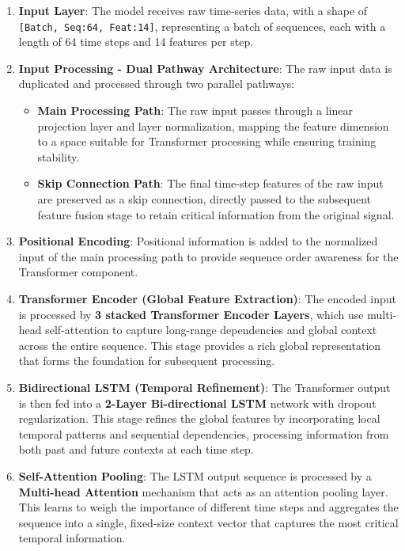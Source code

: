 \begin{enumerate}
    \item \textbf{Input Layer}: The model receives raw time-series data, with a shape of \texttt{[Batch, Seq:64, Feat:14]}, representing a batch of sequences, each with a length of 64 time steps and 14 features per step.
    \item \textbf{Input Processing - Dual Pathway Architecture}: The raw input data is duplicated and processed through two parallel pathways:
    \begin{itemize}
    \item \textbf{Main Processing Path}: The raw input passes through a linear projection layer and layer normalization, mapping the feature dimension to a space suitable for Transformer processing while ensuring training stability.
    
    \item \textbf{Skip Connection Path}: The final time-step features of the raw input are preserved as a skip connection, directly passed to the subsequent feature fusion stage to retain critical information from the original signal.
    \end{itemize}
    
    \item \textbf{Positional Encoding}: Positional information is added to the normalized input of the main processing path to provide sequence order awareness for the Transformer component.

    \item \textbf{Transformer Encoder (Global Feature Extraction)}: The encoded input is processed by \textbf{3 stacked Transformer Encoder Layers}, which use multi-head self-attention to capture long-range dependencies and global context across the entire sequence. This stage provides a rich global representation that forms the foundation for subsequent processing.

    \item \textbf{Bidirectional LSTM (Temporal Refinement)}: The Transformer output is then fed into a \textbf{2-Layer Bi-directional LSTM} network with dropout regularization. This stage refines the global features by incorporating local temporal patterns and sequential dependencies, processing information from both past and future contexts at each time step.

    \item \textbf{Self-Attention Pooling}: The LSTM output sequence is processed by a \textbf{Multi-head Attention} mechanism that acts as an attention pooling layer. This learns to weigh the importance of different time steps and aggregates the sequence into a single, fixed-size context vector that captures the most critical temporal information.


\end{enumerate}
